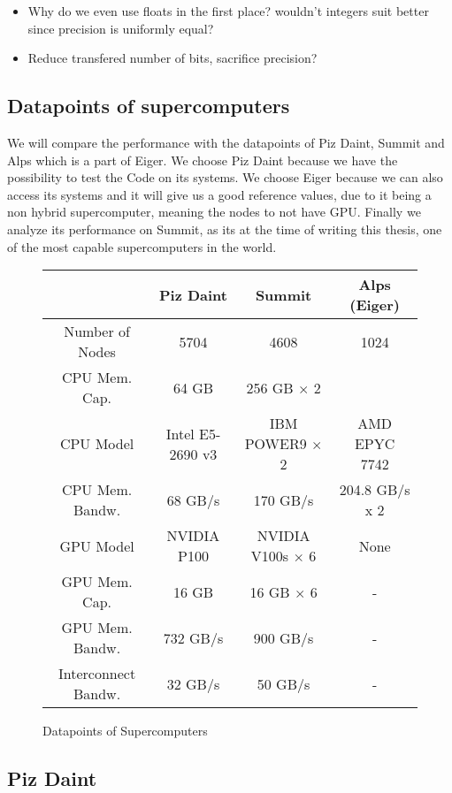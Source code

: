 \documentclass[]{article}
\begin{document}
\begin{itemize}
	\item Why do we even use floats in the first place? wouldn't integers suit better since precision is uniformly equal?
	\item Reduce transfered number of bits, sacrifice precision?
\end{itemize}

\subsection{Datapoints of supercomputers}

We will compare the performance with the datapoints of Piz Daint, Summit and Alps which is a part of Eiger. We choose Piz Daint because we have the possibility to test the Code on its systems. We choose Eiger because we can also access its systems and it will give us a good reference values, due to it being a non hybrid supercomputer, meaning the nodes to not have GPU. Finally we analyze its performance on Summit, as its at the time of writing this thesis, one of the most capable supercomputers in the world.

\small
\begin{figure}[H]
	\begin{center}
		\begin{tabular}{ c c c c }
			& Piz Daint \cite{piz_daint} & Summit & Alps (Eiger) \\ 
			\hline
			Number of Nodes & 5704 & 4608 & 1024\\
			CPU Mem. Cap. & 64 GB & 256 GB $\times$ 2  \\   
			CPU Model & Intel E5-2690 v3 & IBM POWER9 $\times$ 2 & AMD EPYC 7742 \\
			CPU Mem. Bandw.  & 68 GB/s & 170 GB/s & 204.8 GB/s x 2	\\
			GPU Model & NVIDIA P100 & NVIDIA V100s  $\times$ 6 & None \\
			GPU Mem. Cap. & 16 GB & 16 GB $\times$ 6 & -\\
			GPU Mem. Bandw. & 732 GB/s & 900 GB/s & -\\
			Interconnect Bandw. & 32 GB/s & 50 GB/s & -\\
		\end{tabular}
	\end{center}
\caption{Datapoints of Supercomputers}
\label{fig:datapoints}
\end{figure}

\normalfont
\subsection{Piz Daint} 
\end{document}
